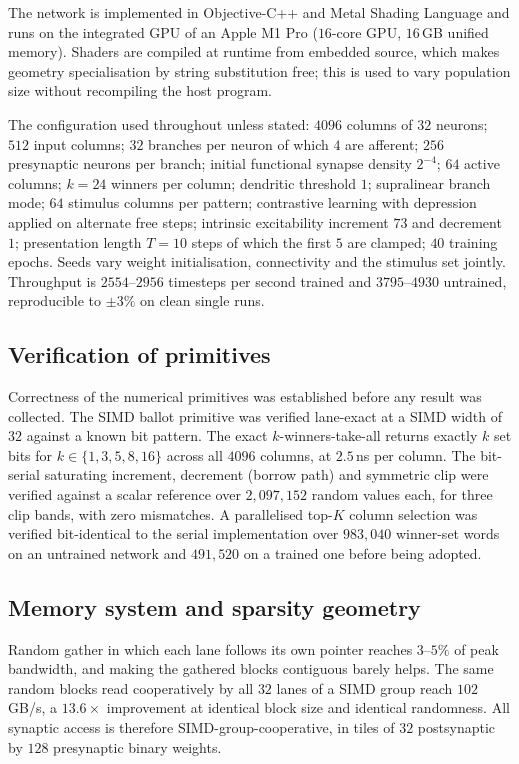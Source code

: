 \documentclass[10pt,twocolumn,a4paper]{article}
\newcommand{\pct}{\%}
\begin{document}
The network is implemented in Objective-C++ and Metal Shading Language and runs on the
integrated GPU of an Apple M1 Pro ($16$-core GPU, $16$\,GB unified memory). Shaders are
compiled at runtime from embedded source, which makes geometry specialisation by string
substitution free; this is used to vary population size without recompiling the host
program.

The configuration used throughout unless stated: $4096$ columns of $32$ neurons; $512$
input columns; $32$ branches per neuron of which $4$ are afferent; $256$ presynaptic
neurons per branch; initial functional synapse density $2^{-4}$; $64$ active columns;
$k=24$ winners per column; dendritic threshold $1$; supralinear branch mode; $64$ stimulus
columns per pattern; contrastive learning with depression applied on alternate free steps;
intrinsic excitability increment $73$ and decrement $1$; presentation length $T=10$ steps
of which the first $5$ are clamped; $40$ training epochs. Seeds vary weight initialisation,
connectivity and the stimulus set jointly. Throughput is $2554$--$2956$ timesteps per
second trained and $3795$--$4930$ untrained, reproducible to $\pm 3\pct$ on clean single
runs.

\subsection{Verification of primitives}

Correctness of the numerical primitives was established before any result was collected.
The SIMD ballot primitive was verified lane-exact at a SIMD width of $32$ against a known
bit pattern. The exact $k$-winners-take-all returns exactly $k$ set bits for
$k \in \{1,3,5,8,16\}$ across all $4096$ columns, at $2.5$\,ns per column. The bit-serial
saturating increment, decrement (borrow path) and symmetric clip were verified against a
scalar reference over $2{,}097{,}152$ random values each, for three clip bands, with zero
mismatches. A parallelised top-$K$ column selection was verified bit-identical to the
serial implementation over $983{,}040$ winner-set words on an untrained network and
$491{,}520$ on a trained one before being adopted.

\subsection{Memory system and sparsity geometry}

Random gather in which each lane follows its own pointer reaches $3$--$5\pct$ of peak
bandwidth, and making the gathered blocks contiguous barely helps. The same random blocks
read cooperatively by all $32$ lanes of a SIMD group reach $102$\,GB/s, a $13.6\times$
improvement at identical block size and identical randomness. All synaptic access is
therefore SIMD-group-cooperative, in tiles of $32$ postsynaptic by $128$ presynaptic binary
weights.
\end{document}
